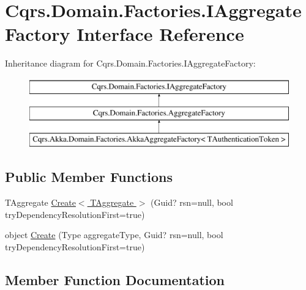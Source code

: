 \hypertarget{interfaceCqrs_1_1Domain_1_1Factories_1_1IAggregateFactory}{}\section{Cqrs.\+Domain.\+Factories.\+I\+Aggregate\+Factory Interface Reference}
\label{interfaceCqrs_1_1Domain_1_1Factories_1_1IAggregateFactory}
Inheritance diagram for Cqrs.\+Domain.\+Factories.\+I\+Aggregate\+Factory\+:\begin{figure}[H]
\begin{center}
\leavevmode
\includegraphics[height=3.000000cm]{interfaceCqrs_1_1Domain_1_1Factories_1_1IAggregateFactory}
\end{center}
\end{figure}
\subsection*{Public Member Functions}
\begin{DoxyCompactItemize}
\item 
T\+Aggregate \hyperlink{interfaceCqrs_1_1Domain_1_1Factories_1_1IAggregateFactory_a3dcbf8900e0d536da241e2e94f74cdd5_a3dcbf8900e0d536da241e2e94f74cdd5}{Create$<$ T\+Aggregate $>$} (Guid? rsn=null, bool try\+Dependency\+Resolution\+First=true)
\item 
object \hyperlink{interfaceCqrs_1_1Domain_1_1Factories_1_1IAggregateFactory_ade388f0dfa9c42964392159a4f97fb1e_ade388f0dfa9c42964392159a4f97fb1e}{Create} (Type aggregate\+Type, Guid? rsn=null, bool try\+Dependency\+Resolution\+First=true)
\end{DoxyCompactItemize}


\subsection{Member Function Documentation}
\mbox{\label{interfaceCqrs_1_1Domain_1_1Factories_1_1IAggregateFactory_ade388f0dfa9c42964392159a4f97fb1e_ade388f0dfa9c42964392159a4f97fb1e}} 
